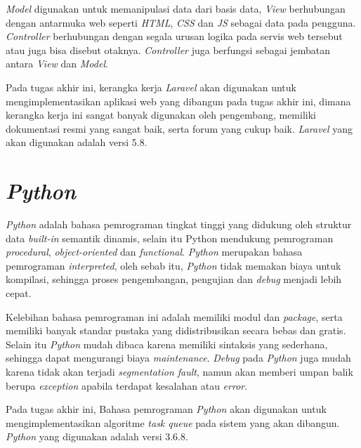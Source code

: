 		\indent \textit{Model} digunakan untuk memanipulasi data dari basis data, \textit{View} berhubungan dengan antarmuka web seperti \textit{HTML}, \textit{CSS} dan \textit{JS} sebagai data pada pengguna. \textit{Controller} berhubungan dengan segala urusan logika pada servis web tersebut atau juga bisa disebut otaknya. \textit{Controller} juga berfungsi sebagai jembatan antara \textit{View} dan \textit{Model}\cite{laraveframework}.
	
		\indent Pada tugas akhir ini, kerangka kerja \textit{Laravel} akan digunakan untuk mengimplementasikan aplikasi web yang dibangun pada tugas akhir ini, dimana kerangka kerja ini sangat banyak digunakan oleh pengembang, memiliki dokumentasi resmi yang sangat baik, serta forum yang cukup baik. \textit{Laravel} yang akan digunakan adalah versi 5.8.
		
	\section{\textit{Python}}
		\textit{Python} adalah bahasa pemrograman tingkat tinggi yang didukung oleh struktur data \textit{built-in} semantik dinamis, selain itu Python mendukung pemrograman \textit{procedural}, \textit{object-oriented} dan \textit{functional}. \textit{Python} merupakan bahasa pemrograman \textit{interpreted}, oleh sebab itu, \textit{Python} tidak memakan biaya untuk kompilasi, sehingga proses pengembangan, pengujian dan \textit{debug} menjadi lebih cepat.
		 
		\indent Kelebihan bahasa pemrograman ini adalah memiliki modul dan \textit{package}, serta memiliki banyak standar pustaka yang didistribusikan secara bebas dan gratis. Selain itu \textit{Python} mudah dibaca karena memiliki sintaksis yang sederhana, sehingga dapat mengurangi biaya \textit{maintenance}. \textit{Debug} pada \textit{Python} juga mudah karena tidak akan terjadi \textit{segmentation fault}, namun akan memberi umpan balik berupa \textit{exception} apabila terdapat kesalahan atau \textit{error}\cite{python}.
		
		\indent Pada tugas akhir ini, Bahasa pemrograman \textit{Python} akan digunakan untuk mengimplementasikan algoritme \textit{task queue} pada sistem yang akan dibangun. \textit{Python} yang digunakan adalah versi 3.6.8.